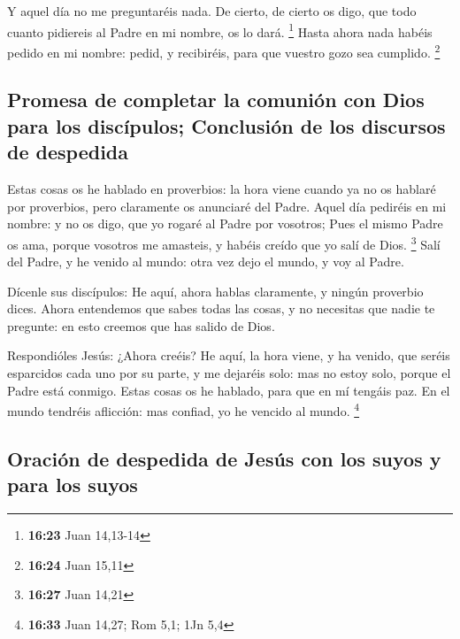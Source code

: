  Y aquel día no me preguntaréis nada. De cierto, de
cierto os digo, que todo cuanto pidiereis al Padre en mi nombre, os lo
dará. \footnote{\textbf{16:23} Juan 14,13-14}  Hasta
ahora nada habéis pedido en mi nombre: pedid, y recibiréis, para que
vuestro gozo sea cumplido. \footnote{\textbf{16:24} Juan 15,11}

\hypertarget{promesa-de-completar-la-comuniuxf3n-con-dios-para-los-discuxedpulos-conclusiuxf3n-de-los-discursos-de-despedida}{%
\subsection{Promesa de completar la comunión con Dios para los
discípulos; Conclusión de los discursos de
despedida}\label{promesa-de-completar-la-comuniuxf3n-con-dios-para-los-discuxedpulos-conclusiuxf3n-de-los-discursos-de-despedida}}

 Estas cosas os he hablado en proverbios: la hora viene
cuando ya no os hablaré por proverbios, pero claramente os anunciaré del
Padre.  Aquel día pediréis en mi nombre: y no os digo,
que yo rogaré al Padre por vosotros;  Pues el mismo Padre
os ama, porque vosotros me amasteis, y habéis creído que yo salí de
Dios. \footnote{\textbf{16:27} Juan 14,21}  Salí del
Padre, y he venido al mundo: otra vez dejo el mundo, y voy al Padre.

 Dícenle sus discípulos: He aquí, ahora hablas
claramente, y ningún proverbio dices.  Ahora entendemos
que sabes todas las cosas, y no necesitas que nadie te pregunte: en esto
creemos que has salido de Dios.

 Respondióles Jesús: ¿Ahora creéis?  He
aquí, la hora viene, y ha venido, que seréis esparcidos cada uno por su
parte, y me dejaréis solo: mas no estoy solo, porque el Padre está
conmigo.  Estas cosas os he hablado, para que en mí
tengáis paz. En el mundo tendréis aflicción: mas confiad, yo he vencido
al mundo. \footnote{\textbf{16:33} Juan 14,27; Rom 5,1; 1Jn 5,4}

\hypertarget{oraciuxf3n-de-despedida-de-jesuxfas-con-los-suyos-y-para-los-suyos}{%
\subsection{Oración de despedida de Jesús con los suyos y para los
suyos}\label{oraciuxf3n-de-despedida-de-jesuxfas-con-los-suyos-y-para-los-suyos}}

